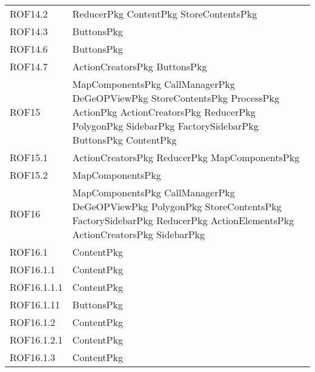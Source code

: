 \begin{longtable}{p{2.5cm}!{\VRule[1pt]}p{5cm}}
		ROF14.2 & ReducerPkg \newline ContentPkg \newline StoreContentsPkg\\
		ROF14.3 & ButtonsPkg\\
		ROF14.6 & ButtonsPkg\\
		ROF14.7 & ActionCreatorsPkg \newline ButtonsPkg\\
		ROF15 & MapComponentsPkg \newline CallManagerPkg \newline DeGeOPViewPkg \newline StoreContentsPkg \newline ProcessPkg \newline ActionPkg \newline ActionCreatorsPkg \newline ReducerPkg \newline PolygonPkg \newline SidebarPkg \newline FactorySidebarPkg \newline ButtonsPkg \newline ContentPkg\\
		ROF15.1 & ActionCreatorsPkg \newline ReducerPkg \newline MapComponentsPkg\\
		ROF15.2 & MapComponentsPkg\\
		ROF16 & MapComponentsPkg \newline CallManagerPkg \newline DeGeOPViewPkg \newline PolygonPkg \newline StoreContentsPkg \newline FactorySidebarPkg \newline ReducerPkg \newline ActionElementsPkg \newline ActionCreatorsPkg \newline SidebarPkg\\
		ROF16.1 & ContentPkg\\
		ROF16.1.1 & ContentPkg\\
		ROF16.1.1.1 & ContentPkg\\
		ROF16.1.11 & ButtonsPkg\\
		ROF16.1.2 & ContentPkg\\
		ROF16.1.2.1 & ContentPkg\\
		ROF16.1.3 & ContentPkg\\

\end{longtable}
